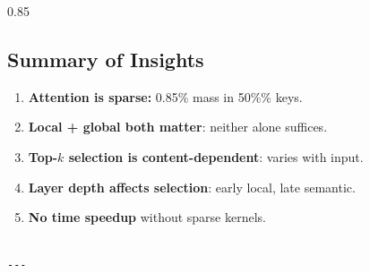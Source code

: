 0.85

\subsection{Summary of Insights}

\begin{enumerate}
\item \textbf{Attention is sparse:} 0.85\% mass in 50\%\% keys.
\item \textbf{Local + global both matter}: neither alone suffices.
\item \textbf{Top-$k$ selection is content-dependent}: varies with input.
\item \textbf{Layer depth affects selection}: early local, late semantic.
\item \textbf{No time speedup} without sparse kernels.
\end{enumerate}
\begin{lstlisting}

---
\end{lstlisting}